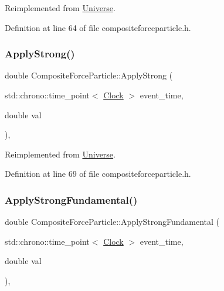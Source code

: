 Reimplemented from \hyperlink{class_universe_a76c0b5e63c2a7d1988c44db341c3d64c}{Universe}.



Definition at line 64 of file compositeforceparticle.\+h.

\mbox{\label{class_composite_force_particle_ac1464a04fbbca2d8927dfdbef0429878}} 
\subsubsection{\texorpdfstring{Apply\+Strong()}{ApplyStrong()}}
{\footnotesize\ttfamily double Composite\+Force\+Particle\+::\+Apply\+Strong (\begin{DoxyParamCaption}\item[{std\+::chrono\+::time\+\_\+point$<$ \hyperlink{universe_8h_a0ef8d951d1ca5ab3cfaf7ab4c7a6fd80}{Clock} $>$}]{event\+\_\+time,  }\item[{double}]{val }\end{DoxyParamCaption})\hspace{0.3cm}{\ttfamily [inline]}, {\ttfamily [virtual]}}



Reimplemented from \hyperlink{class_universe_a906a88b37f10bfa630bef49dfd0e907a}{Universe}.



Definition at line 69 of file compositeforceparticle.\+h.

\mbox{\label{class_composite_force_particle_a64fe19ee12d6ca0a69f650faa5bedb58}} 
\subsubsection{\texorpdfstring{Apply\+Strong\+Fundamental()}{ApplyStrongFundamental()}}
{\footnotesize\ttfamily double Composite\+Force\+Particle\+::\+Apply\+Strong\+Fundamental (\begin{DoxyParamCaption}\item[{std\+::chrono\+::time\+\_\+point$<$ \hyperlink{universe_8h_a0ef8d951d1ca5ab3cfaf7ab4c7a6fd80}{Clock} $>$}]{event\+\_\+time,  }\item[{double}]{val }\end{DoxyParamCaption})\hspace{0.3cm}{\ttfamily [inline]}, {\ttfamily [virtual]}}



